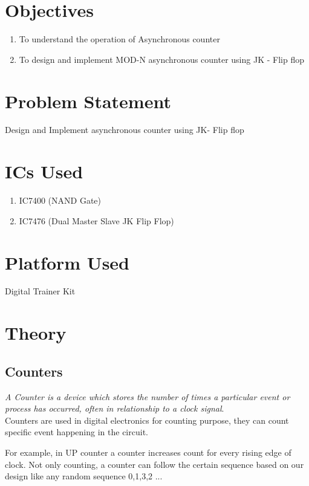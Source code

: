 \documentclass[11pt]{article}
\begin{document}
\tableofcontents
\thispagestyle{empty}
\clearpage


\setcounter{page}{1}
\section{Objectives}
\begin{enumerate}
	\item To understand the operation of Asynchronous counter
	\item To design and implement MOD-N asynchronous counter using JK - Flip flop
\end{enumerate}

\section{Problem Statement}
Design and Implement asynchronous counter using JK- Flip flop

\section{ICs Used}

\begin{enumerate}
	\item IC7400 (NAND Gate)
	\item IC7476 (Dual Master Slave JK Flip Flop)
\end{enumerate}

\section{Platform Used}
Digital Trainer Kit

\section{Theory}

\subsection{Counters}
\textit{A Counter is a device which stores the number of times a particular event or process has occurred, often in relationship to a clock signal}. \\

\noindent
Counters are used in digital electronics for counting purpose, they can count specific event happening in the circuit.

For example, in UP counter a counter increases count for every rising edge of clock. Not only counting, a counter can follow the certain sequence based on our design like any random sequence 0,1,3,2 ...
\end{document}

